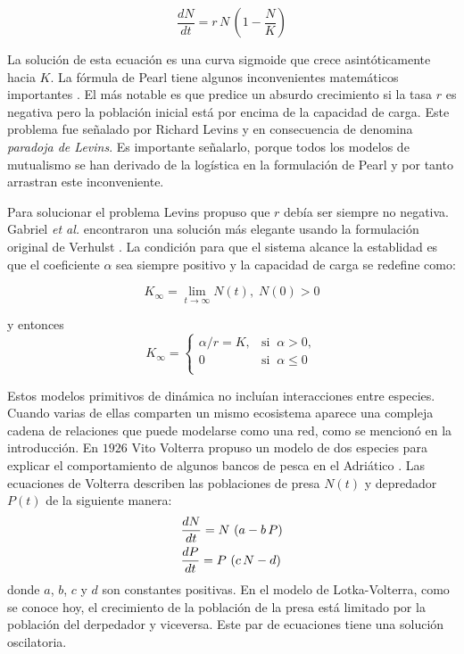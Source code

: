 \begin{equation}
\frac{dN}{dt}=r \, N \, \left(1-\frac{N}{K}\right)
\label{pearl}
\end{equation}

La solución de esta ecuación es una curva sigmoide que crece asintóticamente hacia $K$. La fórmula de Pearl tiene algunos inconvenientes matemáticos importantes \citep{kuno1991some,gabriel2005paradoxes}. El más notable es que predice un absurdo crecimiento si la tasa $r$ es negativa pero la población inicial está por encima de la capacidad de carga. Este problema fue señalado por Richard Levins y en consecuencia de denomina \textit{paradoja de Levins}. Es importante señalarlo, porque todos los modelos de mutualismo se han derivado de la logística en la formulación de Pearl y por tanto arrastran este inconveniente.

Para solucionar el problema Levins propuso que $r$ debía ser siempre no negativa. Gabriel \emph{et al.} encontraron una solución más elegante usando la formulación original de Verhulst \cite{gabriel2005paradoxes}. La condición para que el sistema alcance la establidad es que el coeficiente $\alpha$ sea siempre positivo y la capacidad de carga se redefine como:

\begin{equation}
K_{\infty}=\lim_{t\rightarrow\infty}N(t),\; N(0)>0
\end{equation}

\noindent y entonces
\begin{equation*}
K_{\infty}=\left\{
\begin{array}{ll}
  \alpha / r = K, & \mathrm{si} \;\; \alpha > 0, \\ 0  & \mathrm{si} \;\; \alpha \le0 \\
  \end{array} \right.
\end{equation*}

Estos modelos primitivos de dinámica no incluían interacciones entre especies. Cuando varias de ellas comparten un mismo ecosistema aparece una compleja cadena de relaciones que puede modelarse como una red, como se mencionó en la introducción. En $1926$ Vito Volterra propuso un modelo de dos especies para explicar el comportamiento de algunos bancos de pesca en el Adriático \cite{volterra1926}. Las ecuaciones de Volterra describen las poblaciones de presa $N(t)$ y depredador $P(t)$ de la siguiente manera: 
\begin{align}
\displaystyle &\frac{dN}{dt}=N\, \left(a-b \,P\right) \nonumber\\
\displaystyle &\frac{dP}{dt}=P\, \left(c\, N-d\right) 
\label{myeq1}
\end{align}
\noindent donde $a$, $b$, $c$ y $d$ son constantes positivas. En el modelo de Lotka-Volterra, como se conoce hoy, el crecimiento de la población de la presa está limitado por la población del derpedador y viceversa. Este par de ecuaciones tiene una solución oscilatoria.

